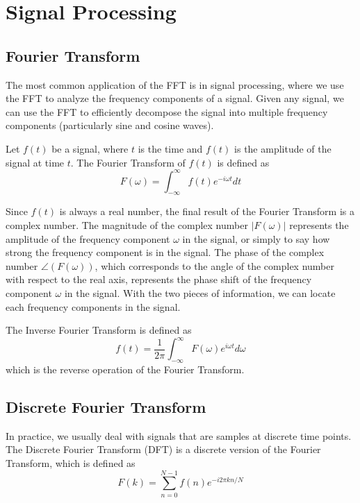 \documentclass[a4paper,12pt]{article}
\begin{document}
\section{Signal Processing}

\subsection{Fourier Transform}

The most common application of the FFT is in signal processing, where we use the FFT to analyze the frequency components of a signal.
Given any signal, we can use the FFT to efficiently decompose the signal into multiple frequency components (particularly sine and cosine waves).

Let $f(t)$ be a signal, where $t$ is the time and $f(t)$ is the amplitude of the signal at time $t$.
The Fourier Transform of $f(t)$ is defined as
\begin{equation*}
	F(\omega) = \int_{-\infty}^{\infty} f(t) e^{-i\omega t} dt
\end{equation*}

Since $f(t)$ is always a real number, the final result of the Fourier Transform is a complex number.
The magnitude of the complex number $|F(\omega)|$ represents the amplitude of the frequency component $\omega$ in the signal, or simply to say how strong the frequency component is in the signal.
The phase of the complex number $\angle(F(\omega))$, which corresponds to the angle of the complex number with respect to the real axis, represents the phase shift of the frequency component $\omega$ in the signal.
With the two pieces of information, we can locate each frequency components in the signal.

The Inverse Fourier Transform is defined as
\begin{equation*}
	f(t) = \frac{1}{2\pi} \int_{-\infty}^{\infty} F(\omega) e^{i\omega t} d\omega
\end{equation*}
which is the reverse operation of the Fourier Transform.

\subsection{Discrete Fourier Transform}

In practice, we usually deal with signals that are samples at discrete time points.
The Discrete Fourier Transform (DFT) is a discrete version of the Fourier Transform, which is defined as
\begin{equation*}
	F(k) = \sum_{n=0}^{N-1} f(n) e^{-i2\pi kn/N}
\end{equation*}
\end{document}
